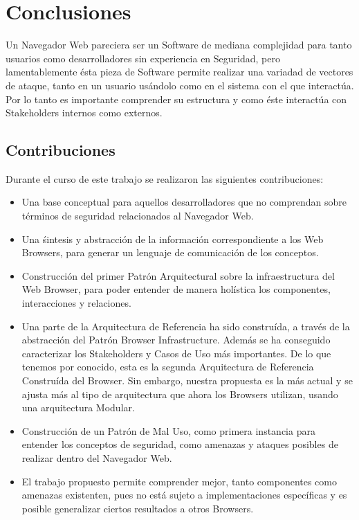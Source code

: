\chapter{Conclusiones}
\label{chap7:concl}

Un Navegador Web pareciera ser un Software de mediana complejidad para tanto usuarios como desarrolladores sin experiencia en Seguridad, pero lamentablemente ésta pieza de Software permite realizar una variadad de vectores de ataque, tanto en un usuario usándolo como en el sistema con el que interactúa. Por lo tanto es importante comprender su estructura y como éste interactúa con Stakeholders internos como externos.


\section{Contribuciones}
Durante el curso de este trabajo se realizaron las siguientes contribuciones:
\begin{itemize}
	\item Una base conceptual para aquellos desarrolladores que no comprendan sobre términos de seguridad relacionados al Navegador Web.
	\item Una śintesis y abstracción de la información correspondiente a los Web Browsers, para generar un lenguaje de comunicación de los conceptos.
	\item Construcción del primer Patrón Arquitectural sobre la infraestructura del Web Browser, para poder entender de manera holística los componentes, interacciones y relaciones.
	\item Una parte de la Arquitectura de Referencia ha sido construída, a través de la abstracción del Patrón Browser Infrastructure. Además se ha conseguido caracterizar los Stakeholders y Casos de Uso más importantes. De lo que tenemos por conocido, esta es la segunda Arquitectura de Referencia Construída del Browser. Sin embargo, nuestra propuesta es la más actual y se ajusta más al tipo de arquitectura que ahora los Browsers utilizan, usando una arquitectura Modular.
	\item Construcción de un Patrón de Mal Uso, como primera instancia para entender los conceptos de seguridad, como amenazas y ataques posibles de realizar dentro del Navegador Web.
	\item El trabajo propuesto permite comprender mejor, tanto componentes como amenazas existenten, pues no está sujeto a implementaciones específicas y es posible generalizar ciertos resultados a otros Browsers.

\end{itemize}


